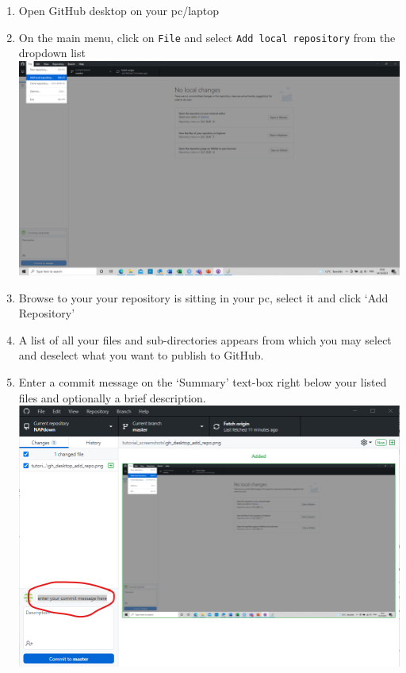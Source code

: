 \documentclass[
]{book}
\begin{document}
\begin{enumerate}
\def\labelenumi{\arabic{enumi}.}
\item
  Open GitHub desktop on your pc/laptop\\
\item
  On the main menu, click on \texttt{File} and select \texttt{Add\ local\ repository} from the dropdown list\\
  \includegraphics{tutorial_screenshots/gh_desktop_add_repo.png}\\
\item
  Browse to your your repository is sitting in your pc, select it and click `Add Repository'
\item
  A list of all your files and sub-directories appears from which you may select and deselect what you want to publish to GitHub.
\item
  Enter a commit message on the `Summary' text-box right below your listed files and optionally a brief description.\\
  \includegraphics{tutorial_screenshots/gh_desktop_commit.png}\\

\end{enumerate}
\end{document}
